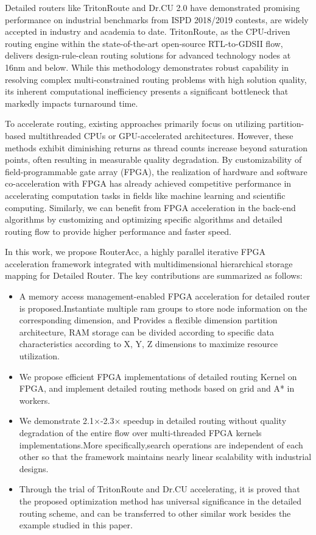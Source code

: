 \documentclass[conference]{IEEEtran}
\begin{document}
Detailed routers like TritonRoute\cite{Tr2021} and Dr.CU 2.0\cite{Dr2019} have demonstrated promising performance on industrial benchmarks from ISPD 2018/2019 contests,
are widely accepted in industry and academia to date. 
TritonRoute, as the CPU-driven routing engine within the state-of-the-art open-source RTL-to-GDSII flow, delivers design-rule-clean routing solutions for advanced technology nodes at 16nm and below. 
While this methodology demonstrates robust capability in resolving complex multi-constrained routing problems with high solution quality, 
its inherent computational inefficiency presents a significant bottleneck that markedly impacts turnaround time.

To accelerate routing, existing approaches primarily focus on utilizing partition-based multithreaded CPUs or GPU-accelerated architectures. 
However, these methods exhibit diminishing returns as thread counts increase beyond saturation points, often resulting in measurable quality degradation. 
By customizability of field-programmable gate array (FPGA), the realization of hardware and software co-acceleration with FPGA 
has already achieved competitive performance in accelerating computation tasks in fields like machine learning and scientific computing. 
Similarly, we can benefit from FPGA acceleration in the back-end algorithms 
by customizing and optimizing specific algorithms and detailed routing flow to provide higher performance and faster speed.

In this work, we propose RouterAcc, a highly parallel iterative FPGA acceleration framework 
integrated with multidimensional hierarchical storage mapping for Detailed Router. 
The key contributions are summarized as follows:

\begin{itemize}
    \item A memory access management-enabled FPGA acceleration for detailed router is proposed.Instantiate multiple ram groups to store node information on the corresponding dimension, and Provides a flexible dimension partition architecture, RAM storage can be divided according to specific data characteristics according to X, Y, Z dimensions to maximize resource utilization.
    \item We propose efficient FPGA implementations of detailed routing Kernel on FPGA, and implement detailed routing methods based on grid and A* in workers.
    \item We demonstrate 2.1$\times$-2.3$\times$ speedup in detailed routing without quality degradation of the entire flow over multi-threaded FPGA kernels implementations.More specifically,search operations are independent of each other so that the framework maintains nearly linear scalability with industrial designs.
    \item Through the trial of TritonRoute and Dr.CU accelerating, it is proved that the proposed optimization method has universal significance in the detailed routing scheme, and can be transferred to other similar work besides the example studied in this paper.
\end{itemize}
\end{document}
